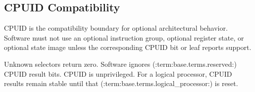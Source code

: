 \subsection{CPUID Compatibility}
CPUID is the compatibility boundary for optional architectural behavior. Software must not use an optional
instruction group, optional register state, or optional state image unless the corresponding CPUID bit or leaf
reports support.

Unknown selectors return zero. Software ignores (:term:base.terms.reserved:) CPUID result bits. CPUID is unprivileged. For a logical
processor, CPUID results remain stable until that (:term:base.terms.logical_processor:) is reset.
